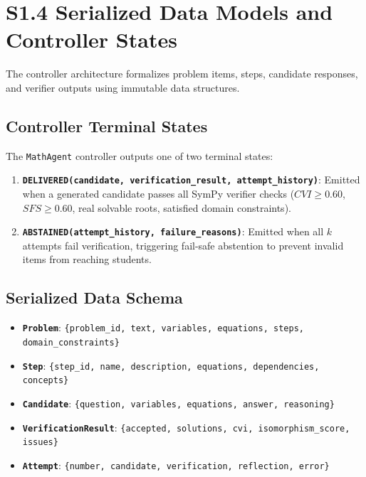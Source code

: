 \documentclass[11pt,letterpaper]{article}
\begin{document}
\section{S1.4 Serialized Data Models and Controller States}\label{sec:s14-data-models}

The controller architecture formalizes problem items, steps, candidate responses, and verifier outputs using immutable data structures.

\subsection{Controller Terminal States}
The \texttt{MathAgent} controller outputs one of two terminal states:
\begin{enumerate}
    \item \textbf{\texttt{DELIVERED(candidate, verification\_result, attempt\_history)}}: Emitted when a generated candidate passes all SymPy verifier checks ($CVI \ge 0.60$, $SFS \ge 0.60$, real solvable roots, satisfied domain constraints).
    \item \textbf{\texttt{ABSTAINED(attempt\_history, failure\_reasons)}}: Emitted when all $k$ attempts fail verification, triggering fail-safe abstention to prevent invalid items from reaching students.
\end{enumerate}

\subsection{Serialized Data Schema}
\begin{itemize}
    \item \textbf{\texttt{Problem}}: \texttt{\{problem\_id, text, variables, equations, steps, domain\_constraints\}}
    \item \textbf{\texttt{Step}}: \texttt{\{step\_id, name, description, equations, dependencies, concepts\}}
    \item \textbf{\texttt{Candidate}}: \texttt{\{question, variables, equations, answer, reasoning\}}
    \item \textbf{\texttt{VerificationResult}}: \texttt{\{accepted, solutions, cvi, isomorphism\_score, issues\}}
    \item \textbf{\texttt{Attempt}}: \texttt{\{number, candidate, verification, reflection, error\}}
\end{itemize}

\end{document}
